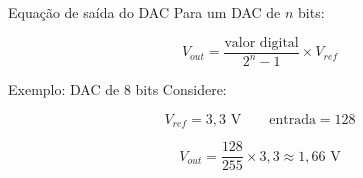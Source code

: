 \begin{frame}{Equação de saída do DAC}
    Para um DAC de $n$ bits:

    \[
        V_{out} =
        \frac{\text{valor digital}}{2^n-1}
        \times V_{ref}
    \]

    \begin{exampleblock}{Exemplo: DAC de 8 bits}
        Considere:

        \[
            V_{ref} = 3{,}3 \text{ V}
            \qquad
            \text{entrada} = 128
        \]

        \[
            V_{out} =
            \frac{128}{255} \times 3{,}3
            \approx 1{,}66 \text{ V}
        \]
    \end{exampleblock}
\end{frame}